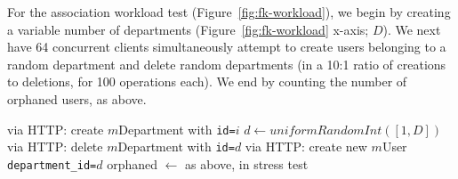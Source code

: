 For the association workload test (Figure~\ref{fig:fk-workload}), we begin by creating a variable number of departments (Figure~\ref{fig:fk-workload} x-axis; $D$). We next have 64 concurrent clients simultaneously attempt to create users belonging to a random department and delete random departments (in a 10:1 ratio of creations to deletions, for 100 operations each). We end by counting the number of orphaned users, as above. \vspace{-1em}
\begin{algorithm}[H]
\begin{algorithmic}
    \State via HTTP: create $m$Department with \texttt{id=$i$}
  \EndFor
      \State $d \gets uniformRandomInt([1, D])$
        \State via HTTP: delete $m$Department with \texttt{id=$d$}
      \Else
        \State via HTTP: create new $m$User \texttt{department\_id=$d$}
      \EndIf        
   \EndParFor
   \State orphaned $\gets $ as above, in stress test
\EndFor
\end{algorithmic}
\end{algorithm}

\balance